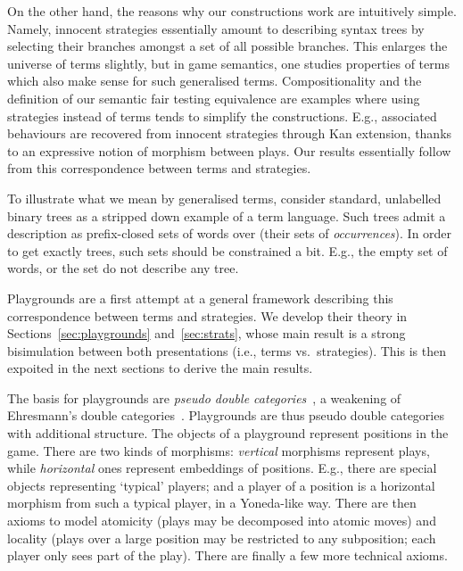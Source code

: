 \documentclass{LMCS}
\theoremstyle{plain}\newtheorem{satz}[thm]{Satz}
\begin{document}
On the other hand, the reasons why our constructions work are
intuitively simple.  Namely, innocent strategies essentially amount to
describing syntax trees by selecting their branches amongst a set of
all possible branches. This enlarges the universe of terms slightly,
but in game semantics, one studies properties of terms which also make
sense for such generalised terms.  Compositionality and the definition
of our semantic fair testing equivalence are examples where using
strategies instead of terms tends to simplify the constructions. E.g.,
associated behaviours are recovered from innocent strategies through
Kan extension, thanks to an expressive notion of morphism between
plays.  Our results essentially follow from this correspondence
between terms and strategies.

\begin{exa}
  To illustrate what we mean by generalised terms, consider standard,
  unlabelled binary trees as a stripped down example of a term
  language.  Such trees admit a description as prefix-closed sets of
  words over  (their sets of \emph{occurrences}). In order
  to get exactly trees, such sets should be constrained a bit. E.g.,
  the empty set of words, or the set  do not describe
  any tree.
\end{exa}

Playgrounds are a first attempt at a general framework describing
this correspondence between terms and strategies. We develop their theory in
Sections~\ref{sec:playgrounds} and~\ref{sec:strats}, whose main result
is a strong bisimulation between both presentations (i.e., terms vs.\
strategies).  This is then expoited in the next sections to derive the
main results.

The basis for playgrounds are \emph{pseudo double
  categories}~\cite{GrandisPare,GrandisPareAdjoints,LeinsterHC,GarnerPhD},
a weakening of Ehresmann's double
categories~\citep{Ehresmann:double,Ehresmann:double2}.  Playgrounds
are thus pseudo double categories with additional structure.  The
objects of a playground represent positions in the game.  There are
two kinds of morphisms: \emph{vertical} morphisms represent plays,
while \emph{horizontal} ones represent embeddings of positions. E.g.,
there are special objects representing `typical' players; and a player
of a position  is a horizontal morphism  from such a
typical player, in a Yoneda-like way. There are then axioms to model
atomicity (plays may be decomposed into atomic moves) and locality
(plays over a large position may be restricted to any subposition;
each player only sees part of the play). There are finally a few more
technical axioms.
\end{document}
